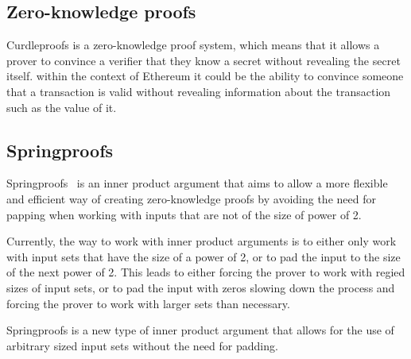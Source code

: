 %


\subsection{Zero-knowledge proofs}\label{sec:background-zkps}
Curdleproofs is a zero-knowledge proof system, which means that it allows a prover to convince a verifier that they know a secret without revealing the secret itself.
within the context of Ethereum it could be the ability to convince someone that a transaction is valid without revealing information about the transaction such as the value of it.



\subsection{Springproofs}\label{sec:background-springproofs}
Springproofs~\cite{zhang2024springproofs} is an inner product argument that aims to allow a more flexible and efficient way of creating zero-knowledge proofs by avoiding the need for papping when working with inputs that are not of the size of power of 2.

Currently, the way to work with inner product arguments is to either only work with input sets that have the size of a power of 2, or to pad the input to the size of the next power of 2.
This leads to either forcing the prover to work with regied sizes of input sets, or to pad the input with zeros slowing down the process and forcing the prover to work with larger sets than necessary.

Springproofs is a new type of inner product argument that allows for the use of arbitrary sized input sets without the need for padding.


